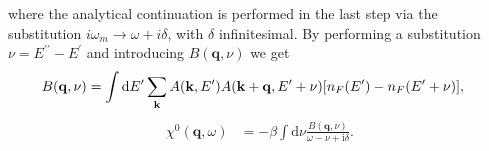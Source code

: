 \documentclass[preprint,prb,amsmath,superscriptaddress,showpacs]{revtex4}
\newcommand{\bk}{\mathbf{k}}
\newcommand{\bq}{\mathbf{q}}
\begin{document}
where the analytical continuation is performed in the last step via the
substitution $i\omega_m \rightarrow \omega + i\delta$, with $\delta$
infinitesimal. By performing a substitution $\nu = E^{\prime \prime} - E^{\prime}$ and introducing $B(\bq, \nu)$ we get
%
\begin{equation}
  \begin{aligned}
    B(\bq, \nu)
    &=
    \int
    \mathrm{d} E'
    \sum_{\bk} A(\bk, E') 
    A(\bk + \bq, E' + \nu)
    \qty[n_F(E') - n_F(E' + \nu) ],
    \end{aligned}
\end{equation}
%
%
\begin{equation}
  \begin{aligned}
    \chi^0(\bq, \omega)
    &=
    - \beta \int
    \mathrm{d}\nu
    \frac{B(\bq, \nu)}{\omega - \nu + \mathrm{i}\delta}.
    \end{aligned}
\end{equation}
%

\iffalse
The imaginary and real parts of the last expression in
Eq.~\ref{eq:continuation} can be obtained using
%
\begin{equation}
  \lim_{\epsilon \rightarrow 0^{+}} \frac{1}{x \pm i\epsilon} = \mp
  i\pi\delta (x) + \mathcal{P}\left( \frac{1}{x} \right):
\end{equation}
%
\begin{equation}
  \label{eq:final_susc}
  \begin{aligned}
    \Im \chi^0(\bq, \omega)
    &= \pi \beta
    \int
    \mathrm{d} E'
    \sum_{\bk} A(\bk, E') 
    A(\bk + \bq, E' + \omega)
    \qty[n_F(E') - n_F(E' + \omega) ].
    \end{aligned}
\end{equation}
This convolution in frequency and wavevector may be computed
efficiently using FFT. The Kramers-Kronig relations allows us
to obtain the real part of the bubble on the real frequency axis:
%
\begin{equation}
  \Re \chi^0(\bq, \omega) =
  \dfrac{1}{\pi} \mathcal{P}
  \int_{-\infty}^{\infty}
  \mathrm{d} \omega' \frac{\Im \chi^0(\bq, \omega)}{\omega' - \omega}.
\end{equation}
%
\fi
\end{document}
